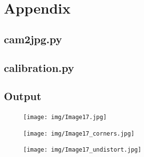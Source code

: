 \documentclass{scrartcl}
\begin{document}
\section{Appendix}


\subsection{cam2jpg.py}



\subsection{calibration.py}



\subsection{Output}
\begin{figure}[H]
\centering
  \texttt{[image: img/Image17.jpg]}
\caption{}
\label{fig:}
\end{figure}

\begin{figure}[H]
\centering
  \texttt{[image: img/Image17\_corners.jpg]}
\caption{}
\label{fig:}
\end{figure}

\begin{figure}[H]
\centering
  \texttt{[image: img/Image17\_undistort.jpg]}
\caption{}
\label{fig:}
\end{figure}









%


\end{document}
